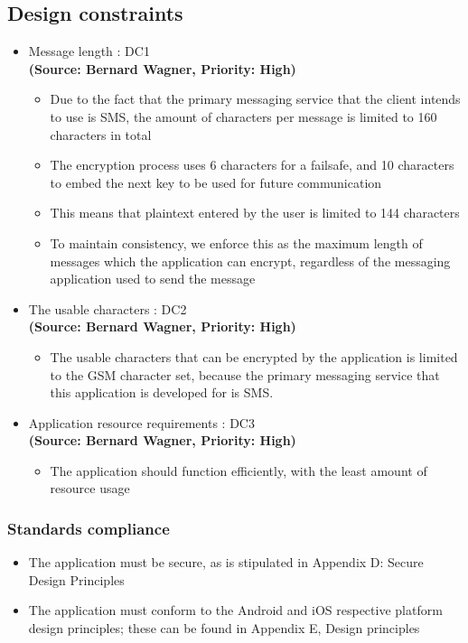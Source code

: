 \subsection{Design constraints}
\begin{itemize}
\item{Message length : DC1}\\
\textbf{(Source: Bernard Wagner, Priority: High)}
\begin{itemize}
\item Due to the fact that the primary messaging service that the client intends to use is SMS, the amount of characters per message is limited to 160 characters in total
\item The encryption process uses 6 characters for a failsafe, and 10 characters to embed the next key to be used for future communication
\item This means that plaintext entered by the user is limited to 144 characters
\item To maintain consistency, we enforce this as the maximum length of messages which the application can encrypt, regardless of the messaging application used to send the message
\end{itemize}
\item{The usable characters : DC2}\\
\textbf{(Source: Bernard Wagner, Priority: High)}
\begin{itemize}
\item The usable characters that can be encrypted by the application is limited to the GSM character set, because the primary messaging service that this application is developed for is SMS.
\end{itemize}
\item{Application resource requirements : DC3}\\
\textbf{(Source: Bernard Wagner, Priority: High)}
\begin{itemize}
\item The application should function efficiently, with the least amount of resource usage
\end{itemize}
\end{itemize}
\subsubsection{Standards compliance}
\begin{itemize}
\item The application must be secure, as is stipulated in Appendix D: Secure Design Principles
\item The application must conform to the Android and iOS respective platform design principles; these can be found in Appendix E, Design principles
\end{itemize}

